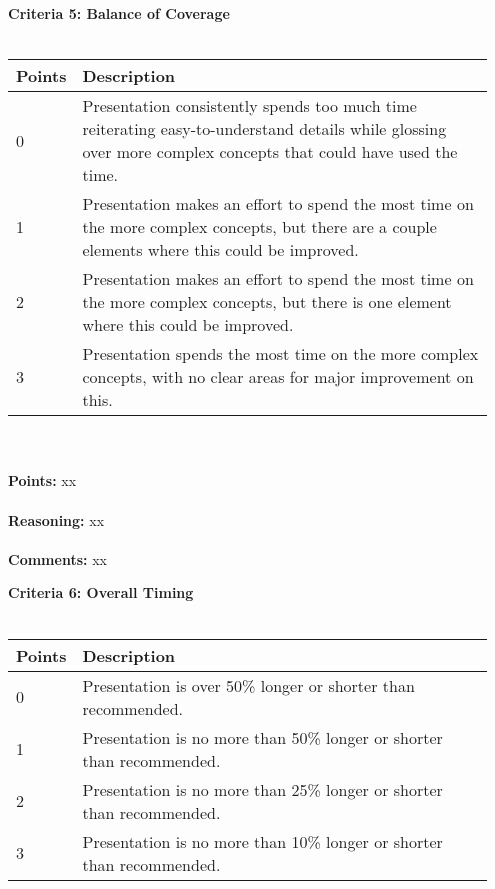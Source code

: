 \documentclass{article}
\begin{document}
\pagebreak


\textbf{\large Criteria 5: Balance of Coverage} \\
\hspace{1cm} \\
\begin{tabular}{|p{0.075\linewidth}||p{0.875\linewidth}|}
    \hline
    \textbf{Points} & \textbf{Description} \\
    \hline
    \hline
    0      & Presentation consistently spends too much time reiterating easy-to-understand details while glossing over more complex concepts that could have used the time. \\
    \hline
    1      & Presentation makes an effort to spend the most time on the more complex concepts, but there are a couple elements where this could be improved. \\
    \hline
    2      & Presentation makes an effort to spend the most time on the more complex concepts, but there is one element where this could be improved. \\
    \hline
    3      & Presentation spends the most time on the more complex concepts, with no clear areas for major improvement on this. \\
    \hline
\end{tabular} \\

\hspace{1cm} \\
\textbf{\large Points: } xx \\

\hspace{1cm} \\
\textbf{\large Reasoning: } xx \\

\hspace{1cm} \\
\textbf{\large Comments: } xx \\

\pagebreak


\textbf{\large Criteria 6: Overall Timing} \\
\hspace{1cm} \\
\begin{tabular}{|p{0.075\linewidth}||p{0.875\linewidth}|}
    \hline
    \textbf{Points} & \textbf{Description} \\
    \hline
    \hline
    0      & Presentation is over 50\% longer or shorter than recommended. \\
    \hline
    1      & Presentation is no more than 50\% longer or shorter than recommended. \\
    \hline
    2      & Presentation is no more than 25\% longer or shorter than recommended. \\
    \hline
    3      & Presentation is no more than 10\% longer or shorter than recommended. \\
    \hline
\end{tabular} \\
\end{document}
